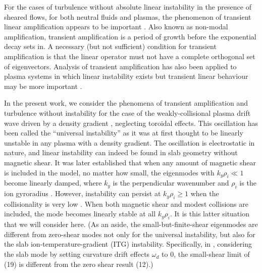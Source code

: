 \documentclass{jpp}
\let\ge=\geqslant  \let\geq=\geqslant
\begin{document}
For the cases of turbulence without absolute linear instability in the presence of sheared flows,
for both neutral fluids and plasmas, the phenomenon of transient linear amplification
appears to be important
\citep{TrefethenSubcritical, FarrellIoannou, Grossman, DelSoleSurvey, TrefethenEmbree, Schmid, Newton, Alex}.
Also known as non-modal amplification, transient amplification is a period of growth before
the exponential decay sets in.
A necessary (but not sufficient) condition for transient amplification
is that the linear operator must not have a complete orthogonal set of eigenvectors.
Analysis of transient amplification has also been applied to plasma systems in which
linear instability exists but transient linear behaviour may be
more important \citep{Camargo, Camporeale2010, Friedman2, SquirePRL, SquireApJ}.

In the present work, we consider the phenomena of transient amplification and turbulence
without instability for the case of the weakly-collisional
plasma drift wave driven by a density gradient \citep{Galeev,Krall3},
neglecting toroidal effects.
This oscillation has been called the ``universal instability'' as it was at first
thought to be linearly unstable in any plasma with a density gradient.
The oscillation is electrostatic in nature, and linear instability can indeed be found
in slab geometry without magnetic shear.
It was later established that when any amount of magnetic shear is included in the model,
no matter how small,
the eigenmodes with $k_y \rho_i \ll 1$ become linearly damped,
where $k_y$ is the perpendicular wavenumber and $\rho_i$ is the ion gyroradius
\citep{Ross, Tsang, Antonsen}.
However, instability can persist at $k_y \rho_i \ge 1$ when the collisionality is
very low \citep{usUniversalInstability}.
When both magnetic shear and modest collisions are included,
the mode becomes linearly stable at all $k_y \rho_i$.
It is this latter situation that we will consider here.
(As an aside, the small-but-finite-shear eigenmodes
are different from zero-shear modes not only for the
universal instability, but also for the slab ion-temperature-gradient (ITG) instability.
Specifically, in \citet{Plunk2014}, considering the slab mode by setting
curvature drift effects $\omega_d$ to 0, the small-shear limit of (19) is different from
the zero shear result (12).)
\end{document}
